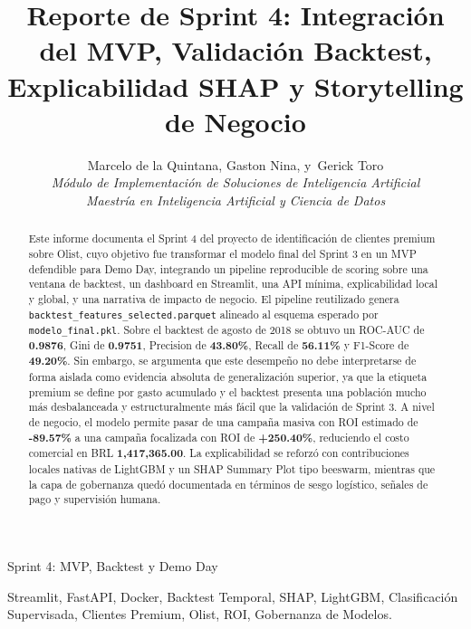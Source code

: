 \documentclass[journal,letterpaper]{IEEEtran}
\begin{document}
\title{Reporte de Sprint 4: Integración del MVP, Validación Backtest, Explicabilidad SHAP y Storytelling de Negocio}

\author{Marcelo de la Quintana,
        Gaston Nina,
        y~Gerick Toro\\
        \textit{Módulo de Implementación de Soluciones de Inteligencia Artificial}\\
        \textit{Maestría en Inteligencia Artificial y Ciencia de Datos}}

%
{Sprint 4: MVP, Backtest y Demo Day}

\maketitle

\begin{abstract}
Este informe documenta el Sprint 4 del proyecto de identificación de clientes premium sobre Olist, cuyo objetivo fue transformar el modelo final del Sprint 3 en un MVP defendible para Demo Day, integrando un pipeline reproducible de scoring sobre una ventana de backtest, un dashboard en Streamlit, una API mínima, explicabilidad local y global, y una narrativa de impacto de negocio. El pipeline reutilizado genera \texttt{backtest\_features\_selected.parquet} alineado al esquema esperado por \texttt{modelo\_final.pkl}. Sobre el backtest de agosto de 2018 se obtuvo un ROC-AUC de \textbf{0.9876}, Gini de \textbf{0.9751}, Precision de \textbf{43.80\%}, Recall de \textbf{56.11\%} y F1-Score de \textbf{49.20\%}. Sin embargo, se argumenta que este desempeño no debe interpretarse de forma aislada como evidencia absoluta de generalización superior, ya que la etiqueta premium se define por gasto acumulado y el backtest presenta una población mucho más desbalanceada y estructuralmente más fácil que la validación de Sprint 3. A nivel de negocio, el modelo permite pasar de una campaña masiva con ROI estimado de \textbf{-89.57\%} a una campaña focalizada con ROI de \textbf{+250.40\%}, reduciendo el costo comercial en BRL \textbf{1,417,365.00}. La explicabilidad se reforzó con contribuciones locales nativas de LightGBM y un SHAP Summary Plot tipo beeswarm, mientras que la capa de gobernanza quedó documentada en términos de sesgo logístico, señales de pago y supervisión humana.
\end{abstract}

\begin{IEEEkeywords}
Streamlit, FastAPI, Docker, Backtest Temporal, SHAP, LightGBM, Clasificación Supervisada, Clientes Premium, Olist, ROI, Gobernanza de Modelos.
\end{IEEEkeywords}
\end{document}
